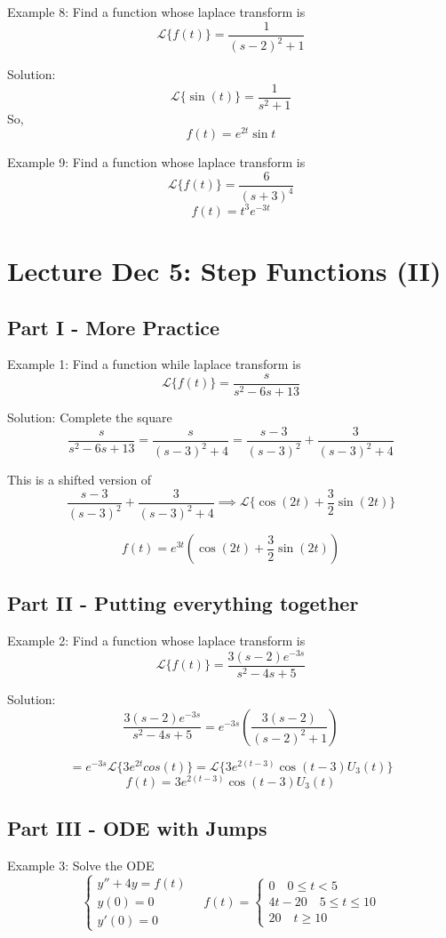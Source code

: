 \documentclass[12pt]{article}
\renewcommand{\L}[1]{\mathcal{L}\{#1\}}
\begin{document}
Example 8: Find a function whose laplace transform is 
\[\L{f(t)} = \frac{1}{(s- 2)^2 + 1}\]

Solution:
\[\L{\sin(t)} = \frac{1}{s^2 + 1}\]
So, 
\[\boxed{f(t) = e^{2t} \sin t}\]

Example 9: Find a function whose laplace transform is 
\[\L{f(t)} = \frac{6}{(s + 3)^4}\]
\[\boxed{f(t) = t^3e^{-3t}}\]

\section{Lecture Dec 5: Step Functions (II)}
\subsection*{Part I - More Practice}
Example 1: Find a function while laplace transform is 
\[\L{f(t)} = \frac{s}{s^2 - 6s + 13}\]

Solution:
Complete the square
\[\frac{s}{s^2 - 6s + 13} = \frac{s}{(s-3)^2 + 4} = \frac{s- 3}{(s-3)^2} + \frac{3}{(s-3)^2 + 4}\]

This is a shifted version of 
\[\frac{s- 3}{(s-3)^2} + \frac{3}{(s-3)^2 + 4} \implies \L{\cos (2t) + \frac{3}{2} \sin (2t)}\]

\[\boxed{f(t) = e^{3t}\left(\cos (2t) + \frac{3}{2} \sin (2t)\right)}\]

\subsection*{Part II - Putting everything together}
Example 2: Find a function whose laplace transform is 
\[\L{f(t)} = \frac{3(s - 2)e^{-3s}}{s^2 - 4s + 5}\]

Solution:
\[\frac{3(s - 2)e^{-3s}}{s^2 - 4s + 5} = e^{-3s} \left(\frac{3(s - 2)}{(s- 2)^2 + 1}\right)\]

\[ = e^{-3s} \L{3e^{2t}cos(t)} = \L{3e^{2(t - 3)} \cos(t- 3) U_3(t)}\]
\[\boxed{f(t) = 3e^{2(t - 3)} \cos(t- 3) U_3(t)}\]

\subsection*{Part III - ODE with Jumps}
Example 3: Solve the ODE 
\[\begin{cases}
    y'' + 4y = f(t)\\
    y(0) = 0\\
    y'(0) = 0
\end{cases} \quad f(t) = \begin{cases}
    0 \quad 0 \leq t < 5\\
    4t - 20 \quad 5 \leq t \leq 10\\
    20 \quad t \geq 10
\end{cases}\]
\end{document}
